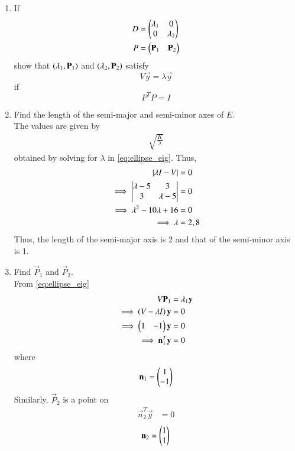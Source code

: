 \documentclass[journal,12pt,twocolumn]{IEEEtran}
\renewcommand\thesection{\arabic{section}}
\begin{document}
\begin{enumerate}[label=\thesection.\arabic*
,ref=\thesection.\theenumi]
\begin{align}
\end{align}
\eqref{eq:ellipsec} transforms to \eqref{eq:ellipseo}.
\item If 
\begin{align}
D &= \begin{pmatrix}\lambda_1 & 0 \\ 0 & \lambda_2 \end{pmatrix}
\\
P &= \begin{pmatrix}\mathbf{P}_1 & \mathbf{P}_2 \end{pmatrix}
\end{align}
show that $\left(\lambda_1, \mathbf{P}_1\right)$ and $\left(\lambda_2, \mathbf{P}_2\right)$ satisfy
\begin{equation}
V\vec{y} = \lambda \vec{y}
\label{eq:ellipse_eig}
\end{equation}
if 
\begin{equation}
P^TP = I
\label{eq:ellipse_trans}
\end{equation}

\item Find the length of the semi-major and semi-minor axes of $E$.
\\
\solution The values are given by
\begin{align}
\sqrt{\frac{K}{\lambda}}
\label{eq:ellipsekl}
\end{align}
obtained by solving for $\lambda$ in \eqref{eq:ellipse_eig}.  Thus,
\begin{align}
\left\vert\lambda I-V\right\vert &= 0
\label{eq:ellipse_ceq}
\\
\implies\begin{vmatrix}\lambda -5 & 3 \\ 3 & \lambda -5\end{vmatrix} & = 0
\\
\implies \lambda^2 -10 \lambda+ 16 &= 0
\\
\implies \lambda &= 2, 8
\end{align}
Thus, the length of the semi-major axis is 2 and that of the semi-minor axis is 1.
\item Find $\vec{P}_1$ and $\vec{P}_2$.
\\
\solution From \eqref{eq:ellipse_eig}
\begin{align}
V\mathbf{P}_1 &= \lambda_1 \mathbf{y}
\\
\implies \left(V-\lambda I\right) \mathbf{y}&= 0
\\
\implies \begin{pmatrix}1 & -1\end{pmatrix} \mathbf{y}&= 0
\\
\implies \mathbf{n}_1^T \mathbf{y}&= 0
\label{eq:ellipsen1}
\end{align}
%
where
\begin{align}
\mathbf{n}_1= \begin{pmatrix}1 \\ -1\end{pmatrix}
\end{align}
%
Similarly, $\vec{P}_2$ is a point on
\begin{align}
\vec{n}_2^T \vec{y}&= 0
\end{align}
%
\begin{align}
\mathbf{n}_2= \begin{pmatrix}1 \\ 1\end{pmatrix}
\end{align}


\end{enumerate}
\end{document}
